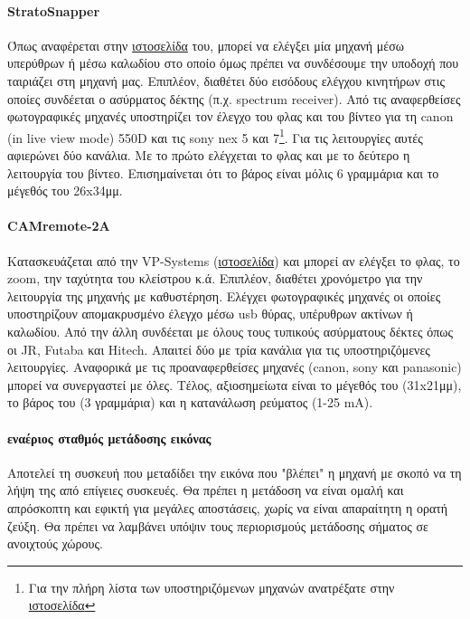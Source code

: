 \documentclass[a4paper, 12pt, twoside]{report}
\begin{document}
{{{{{{			\paragraph{StratoSnapper}{Όπως αναφέρεται στην \href{http://littlesmartthings.com/stratosnapper/}{ιστοσελίδα} του, μπορεί να ελέγξει μία μηχανή μέσω υπερύθρων ή μέσω καλωδίου στο οποίο όμως πρέπει να συνδέσουμε την υποδοχή που ταιριάζει στη μηχανή μας. Επιπλέον, διαθέτει δύο εισόδους ελέγχου κινητήρων στις οποίες συνδέεται ο ασύρματος δέκτης (π.χ. spectrum receiver). Από τις αναφερθείσες φωτογραφικές μηχανές υποστηρίζει τον έλεγχο του φλας και του βίντεο για τη canon (in live view mode) 550D και τις sony nex 5 και 7\footnote{Για την πλήρη λίστα των υποστηριζόμενων μηχανών ανατρέξατε στην \href{http://littlesmartthings.com/stratosnapper-supported-cameras/}{ιστοσελίδα}}. Για τις λειτουργίες αυτές αφιερώνει δύο κανάλια. Με το πρώτο ελέγχεται το φλας και με το δεύτερο η λειτουργία του βίντεο. Επισημαίνεται ότι το βάρος είναι μόλις 6 γραμμάρια και το μέγεθός του 26x34μμ.
			}
			\paragraph{CAMremote-2A}{Κατασκευάζεται από την VP-Systems (\href{http://vp-systems.eu/camremote.html}{ιστοσελίδα}) και μπορεί αν ελέγξει το φλας, το zoom, την ταχύτητα του κλείστρου κ.ά. Επιπλέον, διαθέτει χρονόμετρο για την λειτουργία της μηχανής με καθυστέρηση. Ελέγχει φωτογραφικές μηχανές οι οποίες υποστηρίζουν απομακρυσμένο έλεγχο μέσω usb θύρας, υπέρυθρων ακτίνων ή καλωδίου. Από την άλλη συνδέεται με όλους τους τυπικούς ασύρματους δέκτες όπως οι JR, Futaba και Hitech. Απαιτεί δύο με τρία κανάλια για τις υποστηριζόμενες λειτουργίες. Αναφορικά με τις προαναφερθείσες μηχανές (canon, sony και panasonic) μπορεί να συνεργαστεί με όλες. Τέλος, αξιοσημείωτα είναι το μέγεθός του (31x21μμ), το βάρος του (3 γραμμάρια) και η κατανάλωση ρεύματος (1-25 mA).
			}
			
			\paragraph{εναέριος σταθμός μετάδοσης εικόνας}{Αποτελεί τη συσκευή που μεταδίδει την εικόνα που "βλέπει" η μηχανή με σκοπό να τη λήψη της από επίγειες συσκευές. Θα πρέπει η μετάδοση να είναι ομαλή και απρόσκοπτη και εφικτή για μεγάλες αποστάσεις, χωρίς να είναι απαραίτητη η ορατή ζεύξη. Θα πρέπει να λαμβάνει υπόψιν τους περιορισμούς μετάδοσης σήματος σε ανοιχτούς χώρους.
			}
			
}}}}}}
\end{document}
